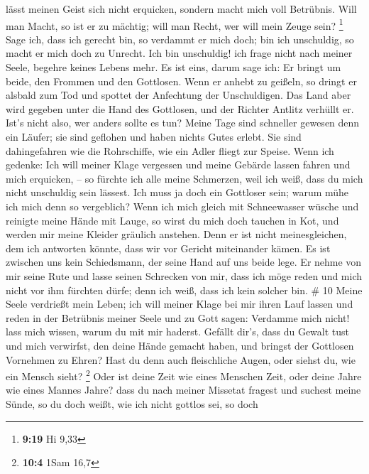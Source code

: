 lässt meinen Geist sich nicht erquicken, sondern macht mich voll
Betrübnis.  Will man Macht, so ist er zu mächtig; will man
Recht, wer will mein Zeuge sein? \footnote{\textbf{9:19} Hi 9,33}
 Sage ich, dass ich gerecht bin, so verdammt er mich doch;
bin ich unschuldig, so macht er mich doch zu Unrecht.  Ich
bin unschuldig! ich frage nicht nach meiner Seele, begehre keines Lebens
mehr.  Es ist eins, darum sage ich: Er bringt um beide, den
Frommen und den Gottlosen.  Wenn er anhebt zu geißeln, so
dringt er alsbald zum Tod und spottet der Anfechtung der Unschuldigen.
 Das Land aber wird gegeben unter die Hand des Gottlosen,
und der Richter Antlitz verhüllt er. Ist's nicht also, wer anders sollte
es tun?  Meine Tage sind schneller gewesen denn ein Läufer;
sie sind geflohen und haben nichts Gutes erlebt.  Sie sind
dahingefahren wie die Rohrschiffe, wie ein Adler fliegt zur Speise.
 Wenn ich gedenke: Ich will meiner Klage vergessen und
meine Gebärde lassen fahren und mich erquicken, --  so
fürchte ich alle meine Schmerzen, weil ich weiß, dass du mich nicht
unschuldig sein lässest.  Ich muss ja doch ein Gottloser
sein; warum mühe ich mich denn so vergeblich?  Wenn ich
mich gleich mit Schneewasser wüsche und reinigte meine Hände mit Lauge,
 so wirst du mich doch tauchen in Kot, und werden mir meine
Kleider gräulich anstehen.  Denn er ist nicht
meinesgleichen, dem ich antworten könnte, dass wir vor Gericht
miteinander kämen.  Es ist zwischen uns kein Schiedsmann,
der seine Hand auf uns beide lege.  Er nehme von mir seine
Rute und lasse seinen Schrecken von mir,  dass ich möge
reden und mich nicht vor ihm fürchten dürfe; denn ich weiß, dass ich
kein solcher bin. \# 10  Meine Seele verdrießt mein Leben;
ich will meiner Klage bei mir ihren Lauf lassen und reden in der
Betrübnis meiner Seele  und zu Gott sagen: Verdamme mich
nicht! lass mich wissen, warum du mit mir haderst.  Gefällt
dir's, dass du Gewalt tust und mich verwirfst, den deine Hände gemacht
haben, und bringst der Gottlosen Vornehmen zu Ehren?  Hast
du denn auch fleischliche Augen, oder siehst du, wie ein Mensch sieht?
\footnote{\textbf{10:4} 1Sam 16,7}  Oder ist deine Zeit wie
eines Menschen Zeit, oder deine Jahre wie eines Mannes Jahre?
 dass du nach meiner Missetat fragest und suchest meine
Sünde,  so du doch weißt, wie ich nicht gottlos sei, so doch
